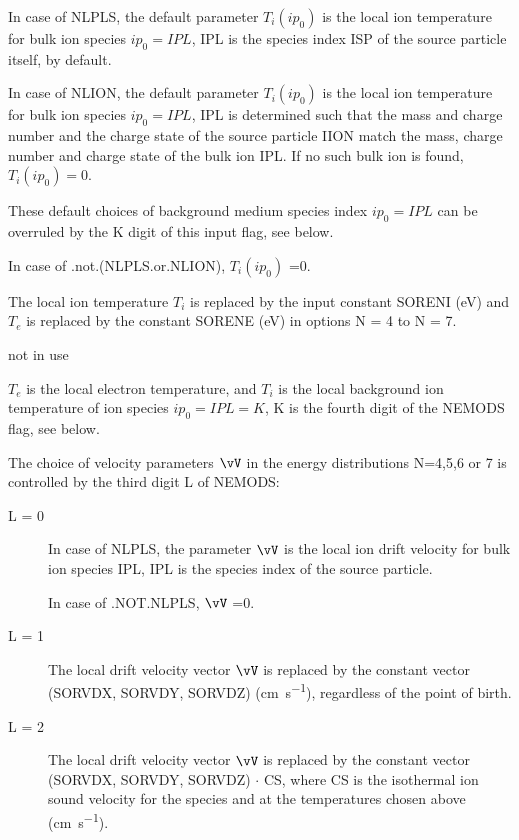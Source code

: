 \begin{description}
\begin{description}
                In case of NLPLS, the default parameter $T_i(ip_0)$ is the local ion
                temperature for bulk ion species $ip_0=IPL$, IPL is the species index ISP of
                the source particle itself, by default.

                In case of NLION, the default parameter $T_i(ip_0)$ is the local ion
                temperature for bulk ion species $ip_0=IPL$, IPL is determined such that the
                mass and charge number and the charge state of the source particle IION match
                the mass, charge number and charge state of the bulk ion IPL.
                If no such bulk ion is found, $T_i(ip_0) = 0$.

                These default choices of background medium species index $ip_0=IPL$ can be
                overruled by the K digit of this input flag, see below.

                In case of .not.(NLPLS.or.NLION), $T_i(ip_0)$ =0.
          \item[M = 1] The local ion temperature $T_i$ is replaced by the input constant
                SORENI (\si{\electronvolt}) and $T_e$ is replaced by the constant SORENE
                (\si{\electronvolt}) in options N = 4 to N = 7.
          \item[M = 2] not in use
          \item[M = 3] $T_e$ is the local electron temperature,
                and $T_i$ is the local background ion temperature of ion species $ip_0 =
                  IPL=K$, K is the fourth digit of the NEMODS flag, see below.

        \end{description}
        The choice of velocity parameters $\vV$ in the energy distributions N=4,5,6 or
        7 is controlled by the third digit L of NEMODS:
        \begin{description}
          \item[L = 0] In case of NLPLS, the parameter $\vV$ is the local ion drift
                velocity for bulk ion species IPL, IPL is the species index of the source
                particle.

                In case of .NOT.NLPLS, $\vV$ =0.
          \item[L = 1] The local drift velocity vector $\vV $ is replaced by the constant
                vector (SORVDX, SORVDY, SORVDZ) (\si{\centi\metre\per\second}), regardless of
                the point of birth.

          \item[L = 2] The local drift velocity vector $\vV $ is replaced by the constant
                vector (SORVDX, SORVDY, SORVDZ) $ \cdot $ CS, where CS is the isothermal ion
                sound velocity for the species and at the temperatures chosen above
                (\si{\centi\metre\per\second}).


\end{description}
\end{description}
